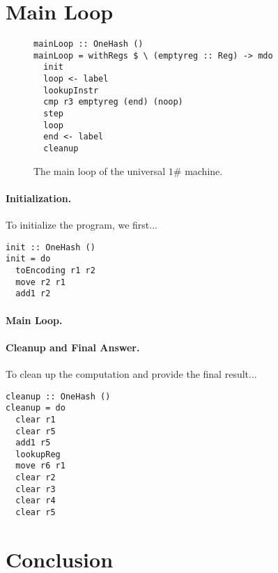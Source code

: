 \documentclass[10pt, preprint, nocopyrightspace]{sigplanconf}
\newcommand{\oh}{$1\#$\xspace}
\begin{document}
\section{Main Loop}

\begin{figure}
\begin{lstlisting}
mainLoop :: OneHash ()
mainLoop = withRegs $ \ (emptyreg :: Reg) -> mdo
  init
  loop <- label
  lookupInstr
  cmp r3 emptyreg (end) (noop)
  step
  loop
  end <- label
  cleanup
\end{lstlisting}
\caption{The main loop of the universal \oh machine.}
\end{figure}

\paragraph{Initialization.}

To initialize the program, we first...

\begin{lstlisting}
init :: OneHash ()
init = do
  toEncoding r1 r2
  move r2 r1
  add1 r2
\end{lstlisting}

\paragraph{Main Loop.}

\paragraph{Cleanup and Final Answer.}

To clean up the computation and provide the final result...

\begin{lstlisting}
cleanup :: OneHash ()
cleanup = do
  clear r1
  clear r5
  add1 r5
  lookupReg
  move r6 r1
  clear r2
  clear r3
  clear r4
  clear r5
\end{lstlisting}

\section{Conclusion}
\end{document}
